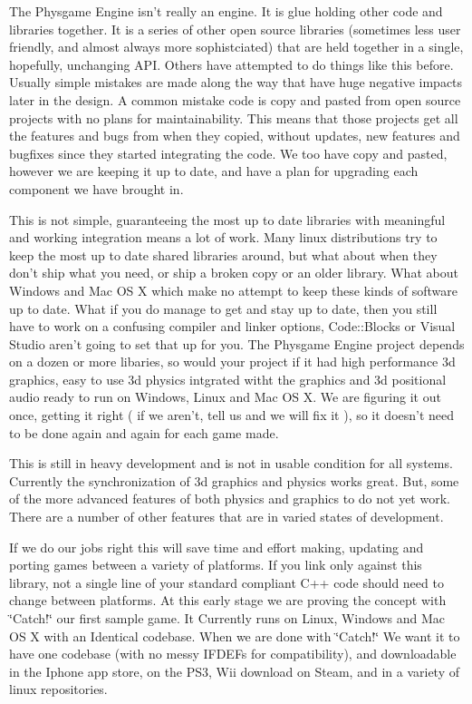 The Physgame Engine isn't really an engine. It is glue holding other code and libraries together. It is a series of other open source libraries (sometimes less user friendly, and almost always more sophistciated) that are held together in a single, hopefully, unchanging API. Others have attempted to do things like this before. Usually simple mistakes are made along the way that have huge negative impacts later in the design. A common mistake code is copy and pasted from open source projects with no plans for maintainability. This means that those projects get all the features and bugs from when they copied, without updates, new features and bugfixes since they started integrating the code. We too have copy and pasted, however we are keeping it up to date, and have a plan for upgrading each component we have brought in.

This is not simple, guaranteeing the most up to date libraries with meaningful and working integration means a lot of work. Many linux distributions try to keep the most up to date shared libraries around, but what about when they don't ship what you need, or ship a broken copy or an older library. What about Windows and Mac OS X which make no attempt to keep these kinds of software up to date. What if you do manage to get and stay up to date, then you still have to work on a confusing compiler and linker options, Code::Blocks or Visual Studio aren't going to set that up for you. The Physgame Engine project depends on a dozen or more libaries, so would your project if it had high performance 3d graphics, easy to use 3d physics intgrated witht the graphics and 3d positional audio ready to run on Windows, Linux and Mac OS X. We are figuring it out once, getting it right ( if we aren't, tell us and we will fix it ), so it doesn't need to be done again and again for each game made.

This is still in heavy development and is not in usable condition for all systems. Currently the synchronization of 3d graphics and physics works great. But, some of the more advanced features of both physics and graphics to do not yet work. There are a number of other features that are in varied states of development.

If we do our jobs right this will save time and effort making, updating and porting games between a variety of platforms. If you link only against this library, not a single line of your standard compliant C++ code should need to change between platforms. At this early stage we are proving the concept with \char`\"{}Catch!\char`\"{} our first sample game. It Currently runs on Linux, Windows and Mac OS X with an Identical codebase. When we are done with \char`\"{}Catch!\char`\"{} We want it to have one codebase (with no messy IFDEFs for compatibility), and downloadable in the Iphone app store, on the PS3, Wii download on Steam, and in a variety of linux repositories.

